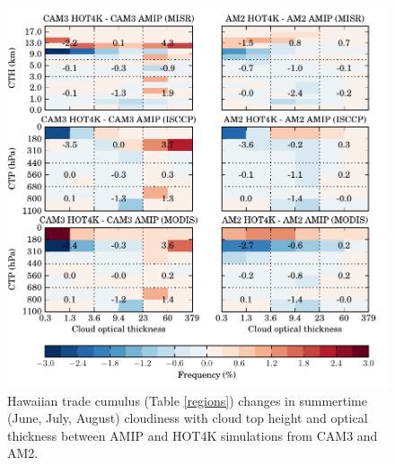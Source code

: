 \begin{figure}
    \centering
    \includegraphics{../graphics/hist2d_cmip3hot4k_hawaiian.pdf}
    \caption[Hawaiian trade cumulus changes in summertime cloudiness with cloud top height and optical thickness between AMIP and HOT4K simulations from CAM3 and AM2.]{Hawaiian trade cumulus (Table \ref{regions}) changes in summertime (June, July, August) cloudiness with cloud top height and optical thickness between AMIP and HOT4K simulations from CAM3 and AM2.}
    \label{hist2d_cmip3hot4k_hawaiian}
\end{figure}

